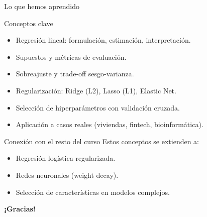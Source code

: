 \documentclass[aspectratio=169, 10pt, xcolor=table]{beamer}
\begin{document}
\begin{frame}{Lo que hemos aprendido}
    \begin{exampleblock}{Conceptos clave}
        \begin{itemize}
            \item Regresión lineal: formulación, estimación, interpretación.
            \item Supuestos y métricas de evaluación.
            \item Sobreajuste y trade-off sesgo-varianza.
            \item Regularización: Ridge (L2), Lasso (L1), Elastic Net.
            \item Selección de hiperparámetros con validación cruzada.
            \item Aplicación a casos reales (viviendas, fintech, bioinformática).
        \end{itemize}
    \end{exampleblock}
    \vspace{0.3cm}
    \begin{block}{Conexión con el resto del curso}
        Estos conceptos se extienden a:
        \begin{itemize}
            \item Regresión logística regularizada.
            \item Redes neuronales (weight decay).
            \item Selección de características en modelos complejos.
        \end{itemize}
    \end{block}
\end{frame}

\begin{frame}
    \centering
    \Huge \textbf{¡Gracias!}

\end{frame}
\end{document}
